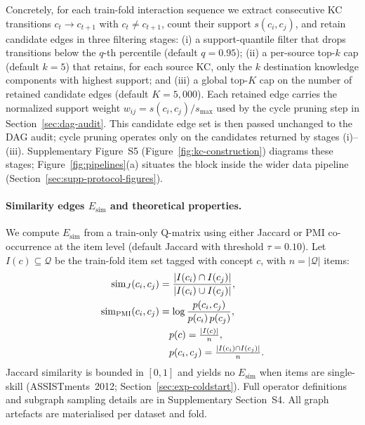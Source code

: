 \documentclass[pdflatex,sn-mathphys-num]{sn-jnl}
\newcommand{\Esim}{\ensuremath{E_{\text{sim}}}}
\newcommand{\KCs}{knowledge components}
\begin{document}
Concretely, for each train-fold interaction sequence we extract
consecutive KC transitions $c_{t} \rightarrow c_{t+1}$ with
$c_{t} \neq c_{t+1}$, count their support $s(c_i, c_j)$, and retain
candidate edges in three filtering stages:
(i) a support-quantile filter that drops transitions below the
$q$-th percentile (default $q = 0.95$);
(ii) a per-source top-$k$ cap (default $k = 5$) that retains, for each
source KC, only the $k$ destination \KCs{} with highest support; and
(iii) a global top-$K$ cap on the number of retained candidate edges
(default $K = 5{,}000$). Each retained edge carries the normalized
support weight $w_{ij} = s(c_i, c_j) / s_{\max}$ used by the cycle
pruning step in Section~\ref{sec:dag-audit}. This candidate edge set
is then passed unchanged to the DAG audit; cycle pruning operates only
on the candidates returned by stages (i)--(iii).
Supplementary Figure~S5 (Figure~\ref{fig:kc-construction}) diagrams these
stages; Figure~\ref{fig:pipelines}(a) situates the block inside the wider
data pipeline (Section~\ref{sec:supp-protocol-figures}).

\paragraph{Similarity edges $\Esim$ and theoretical properties.}
\label{sec:graph-sim-theory}
We compute $\Esim$ from a train-only Q-matrix using either Jaccard or
PMI co-occurrence at the item level (default Jaccard with threshold
$\tau{=}0.10$). Let $I(c)\subseteq\mathcal{Q}$ be the train-fold item
set tagged with concept $c$, with $n=|\mathcal{Q}|$ items:
\begin{align}
\mathrm{sim}_J(c_i,c_j) &=
  \frac{|I(c_i)\cap I(c_j)|}{|I(c_i)\cup I(c_j)|},
  \label{eq:sim-jaccard}\\
\mathrm{sim}_{\mathrm{PMI}}(c_i,c_j) &=
  \log \frac{p(c_i,c_j)}{p(c_i)\,p(c_j)},
  \label{eq:sim-pmi}\notag\\
&\quad p(c)=\tfrac{|I(c)|}{n},\notag\\
&\quad p(c_i,c_j)=\tfrac{|I(c_i)\cap I(c_j)|}{n}.
\end{align}
Jaccard similarity is bounded in $[0,1]$ and yields no $\Esim$ when items are
single-skill (ASSISTments~2012; Section~\ref{sec:exp-coldstart}). Full
operator definitions and subgraph sampling details are in Supplementary
Section~S4. All graph artefacts are materialised per dataset and fold.
\end{document}
